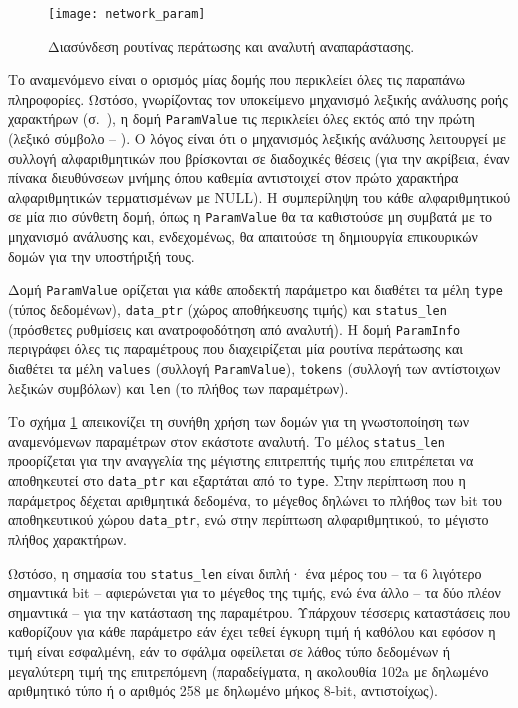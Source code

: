 \begin{figure}
    \caption{Διασύνδεση ρουτίνας περάτωσης και αναλυτή αναπαράστασης.
    \label{fig:network:param}}
    \begin{center}
    \texttt{[image: network\_param]}
    \end{center}
\end{figure}

Το αναμενόμενο είναι ο ορισμός μίας δομής που περικλείει όλες τις παραπάνω
πληροφορίες. Ωστόσο, γνωρίζοντας τον υποκείμενο μηχανισμό λεξικής ανάλυσης ροής
χαρακτήρων (σ.~\pageref{ssubsec:network:stream-match}), η δομή \verb~ParamValue~
τις περικλείει όλες εκτός από την πρώτη (λεξικό σύμβολο -- ). Ο λόγος
είναι ότι ο μηχανισμός λεξικής ανάλυσης λειτουργεί με συλλογή αλφαριθμητικών που
βρίσκονται σε διαδοχικές θέσεις (για την ακρίβεια, έναν πίνακα διευθύνσεων
μνήμης όπου καθεμία αντιστοιχεί στον πρώτο χαρακτήρα αλφαριθμητικών
τερματισμένων με NULL). Η συμπερίληψη του κάθε αλφαριθμητικού σε μία πιο σύνθετη
δομή, όπως η \verb~ParamValue~ θα τα καθιστούσε μη συμβατά με το μηχανισμό
ανάλυσης και, ενδεχομένως, θα απαιτούσε τη δημιουργία επικουρικών δομών για την
υποστήριξή τους.

Δομή \verb~ParamValue~ ορίζεται για κάθε αποδεκτή παράμετρο και διαθέτει τα μέλη
\verb~type~ (τύπος δεδομένων), \verb~data_ptr~ (χώρος αποθήκευσης τιμής) και
\verb~status_len~ (πρόσθετες ρυθμίσεις και ανατροφοδότηση από αναλυτή). Η δομή
\verb~ParamInfo~ περιγράφει όλες τις παραμέτρους που διαχειρίζεται μία ρουτίνα
περάτωσης και διαθέτει τα μέλη \verb~values~ (συλλογή \verb~ParamValue~),
\verb~tokens~ (συλλογή των αντίστοιχων λεξικών συμβόλων) και \verb~len~ (το
πλήθος των παραμέτρων).

Το σχήμα \ref{fig:network:param} απεικονίζει τη συνήθη χρήση των δομών για τη
γνωστοποίηση των αναμενόμενων παραμέτρων στον εκάστοτε αναλυτή.
Το μέλος \verb~status_len~ προορίζεται για την αναγγελία της
μέγιστης επιτρεπτής τιμής που επιτρέπεται να αποθηκευτεί στο \verb~data_ptr~ και
εξαρτάται από το \verb~type~. Στην περίπτωση που η παράμετρος δέχεται αριθμητικά
δεδομένα, το μέγεθος δηλώνει το πλήθος των bit του αποθηκευτικού χώρου
\verb~data_ptr~, ενώ στην περίπτωση αλφαριθμητικού, το μέγιστο πλήθος
χαρακτήρων.

Ωστόσο, η σημασία του \verb~status_len~ είναι διπλή· ένα μέρος του -- τα 6
λιγότερο σημαντικά bit -- αφιερώνεται για το μέγεθος της τιμής, ενώ ένα άλλο --
τα δύο πλέον σημαντικά -- για την κατάσταση της παραμέτρου. Υπάρχουν τέσσερις
καταστάσεις που καθορίζουν για κάθε παράμετρο εάν έχει τεθεί έγκυρη τιμή ή
καθόλου και εφόσον η τιμή είναι εσφαλμένη, εάν το σφάλμα οφείλεται σε λάθος τύπο
δεδομένων ή μεγαλύτερη τιμή της επιτρεπόμενη (παραδείγματα, η ακολουθία 102a με
δηλωμένο αριθμητικό τύπο ή ο αριθμός 258 με δηλωμένο μήκος 8-bit, αντιστοίχως).



